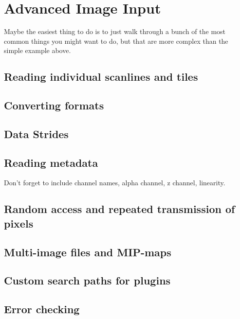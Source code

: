 \section{Advanced Image Input}
\label{sec:advancedimageinput}

Maybe the easiest thing to do is to just walk through a bunch of the
most common things you might want to do, but that are more complex than
the simple example above.

\subsection{Reading individual scanlines and tiles}
\label{sec:imageinput:scanlinestiles}

\subsection{Converting formats}
\label{sec:imageinput:convertingformat}

\subsection{Data Strides}
\label{sec:imageinput:strides}

\subsection{Reading metadata}
\label{sec:imageinput:metadata}

Don't forget to include channel names, alpha channel, z channel,
linearity.

\subsection{Random access and repeated transmission of pixels}
\label{sec:imageoutput:randomrepeated}

\subsection{Multi-image files and MIP-maps}
\label{sec:imageinput:multiimage}

\subsection{Custom search paths for plugins}
\label{sec:imageinput:searchpaths}

\subsection{Error checking}
\label{sec:imageinput:errors}

